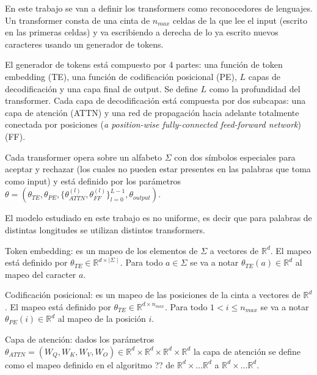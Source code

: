 
En este trabajo se van a definir los transformers como reconocedores de lenguajes.
Un transformer consta de una cinta de $n_{max}$ celdas de la que lee el input (escrito en las primeras celdas) y va escribiendo a derecha de lo ya escrito nuevos caracteres usando un generador de tokens.



El generador de tokens está compuesto por 4 partes: una función de token embedding (TE), una función de codificación posicional (PE), $L$ capas de decodificación y una capa final de output.
Se define $L$ como la profundidad del transformer.
Cada capa de decodificación está compuesta por dos subcapas: una capa de atención (ATTN) y una red de propagación hacia adelante totalmente conectada por posiciones (\textit{a position-wise fully-connected feed-forward network}) (FF). 

Cada transformer opera sobre un alfabeto $\Sigma$ con dos símbolos especiales para aceptar y rechazar (los cuales no pueden estar presentes en las palabras que toma como input) y está definido por los parámetros $\theta = (\theta_{TE}, \theta_{PE}, \{\theta_{ATTN}^{(l)}, \theta_{FF}^{(l)}\}_{l=0}^{L-1}, \theta_{output})$. 

El modelo estudiado en este trabajo es no uniforme, es decir que para palabras de distintas longitudes se utilizan distintos transformers.

Token embedding: es un mapeo de los elementos de $\Sigma$ a vectores de $\mathbb{R}^d$. El mapeo está definido por $\theta_{TE} \in \mathbb{R}^{d \times \mid \Sigma \mid}$. Para todo $a \in \Sigma$ se va a notar $\theta_{TE}(a) \in \mathbb{R}^d$ al mapeo del caracter $a$.

Codificación posicional: es un mapeo de las posiciones de la cinta a vectores de $\mathbb{R}^d$. El mapeo está definido por $\theta_{TE} \in \mathbb{R}^{d \times n_{max}}$. Para todo $1 < i \leq n_{max}$ se va a notar $\theta_{PE}(i) \in \mathbb{R}^d$ al mapeo de la posición $i$.

Capa de atención: dados los parámetros $\theta_{ATTN} = (W_Q, W_K , W_V , W_O) \in \mathbb{R}^d \times \mathbb{R}^d \times \mathbb{R}^d \times \mathbb{R}^d$ la capa de atención se define como el mapeo definido en el algoritmo ?? de $\mathbb{R}^{d} \times \dots \mathbb{R}^d$ a $\mathbb{R}^{d} \times \dots \mathbb{R}^d$. 

